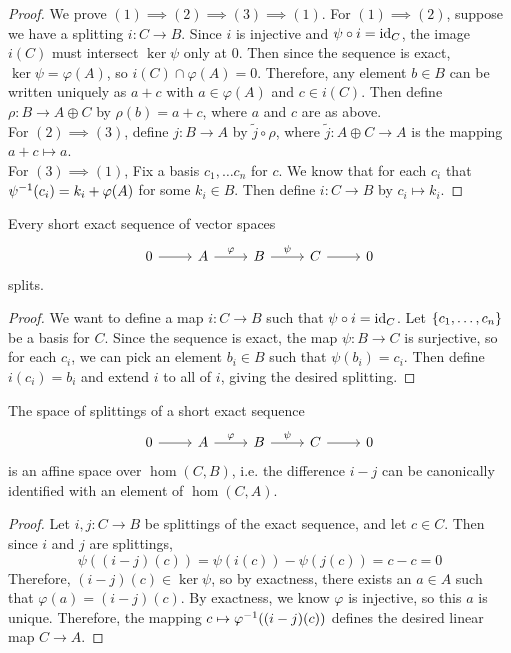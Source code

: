 %
\begin{proof}
We prove $(1) \implies (2) \implies (3) \implies (1)$. For $(1) \implies (2)$,
suppose we have a splitting $i : C \to B$. Since $i$ is injective and
$\psi \circ i = \operatorname{id}_C$, the image $i(C)$ must intersect $\ker\psi$ only
at $0$. Then since the sequence is exact, $\ker\psi = \varphi(A)$, so
$i(C) \cap \varphi(A) = 0$. Therefore, any element $b \in B$ can be written
uniquely as $a + c$ with $a \in \varphi(A)$ and $c \in i(C)$. Then define
$\rho : B \to A \oplus C$ by $\rho(b) = a + c$, where $a$ and $c$ are as above.\\

For $(2) \implies (3)$, define $j : B \to A$ by $\tilde{j} \circ \rho$, where
$\tilde{j} : A \oplus C \to A$ is the mapping $a + c \mapsto a$. \\

For $(3) \implies (1)$, Fix a basis $c_1, \ldots c_n$ for $c$. We know that
for each $c_i$ that $\psi^{-1}(c_i) = k_i + \varphi(A)$ for some $k_i \in B$.
Then define $i : C \to B$ by $c_i \mapsto k_i$.
\end{proof}
%
\begin{lem}
Every short exact sequence of vector spaces
\[\begin{tikzcd}
0 \ar[r] & A \ar[r, "\varphi"] & B \ar[r, "\psi"] & C \ar[r] & 0
\end{tikzcd}\]
splits.
\end{lem}
%
\begin{proof}
We want to define a map $i : C \to B$ such that $\psi \circ i = \operatorname{id}_C$. Let
$\left\lbrace c_1, \ldots, c_n \right\rbrace$ be a basis for $C$. Since the sequence is exact,
the map $\psi : B \to C$ is surjective, so for each $c_i$, we can pick an element
$b_i \in B$ such that $\psi(b_i) = c_i$. Then define $i(c_i) = b_i$ and
extend $i$ to all of $i$, giving the desired splitting.
\end{proof}
%
\begin{lem}
The space of splittings of a short exact sequence
\[\begin{tikzcd}
0 \ar[r] & A \ar[r, "\varphi"] & B \ar[r, "\psi"] & C \ar[r] & 0
\end{tikzcd}\]
is an affine space over $\hom(C,B)$,
i.e. the difference $i - j$ can be canonically identified with an element of
$\hom(C,A)$.
\end{lem}
%
\begin{proof} %
Let $i,j : C \to B$ be splittings of the exact sequence, and let
$c \in C$. Then since $i$ and $j$ are splittings,
\[
\psi((i-j)(c)) = \psi(i(c)) - \psi(j(c)) = c - c = 0
\]
Therefore, $(i-j)(c) \in \ker\psi$, so by exactness, there exists an $a \in A$
such that $\varphi(a) = (i-j)(c)$. By exactness, we know $\varphi$ is injective,
so this $a$ is unique. Therefore, the mapping $c \mapsto \varphi^{-1}((i-j)(c))$
defines the desired linear map $C \to A$.
\end{proof}
